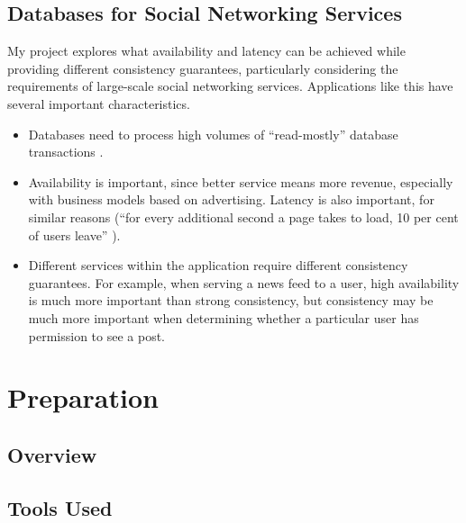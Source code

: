 \documentclass[12pt,a4paper,twoside,openright]{report}
\begin{document}
\section{Databases for Social Networking Services}

My project explores what availability and latency can be achieved while providing different consistency guarantees, particularly considering the requirements of large-scale social networking services. Applications like this have several important characteristics.

\begin{itemize}
\item
Databases need to process high volumes of ``read-mostly'' database transactions \cite{fox1999harvest} \cite{nunemaker}.

\item
Availability is important, since better service means more revenue, especially with business models based on advertising. Latency is also important, for similar reasons (``for every additional second a page takes to load, 10 per cent of users leave'' \cite{clark_2018}).

\item
Different services within the application require different consistency guarantees. For example, when serving a news feed to a user, high availability is much more important than strong consistency, but consistency may be much more important when determining whether a particular user has permission to see a post.

\end{itemize}

\chapter{Preparation}


\section{Overview}


\section{Tools Used}
\end{document}
